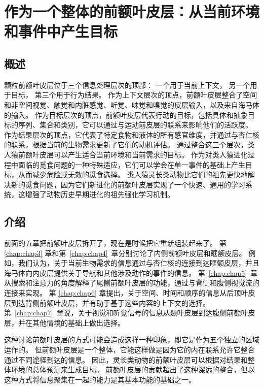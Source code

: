 \chapter{作为一个整体的前额叶皮层：从当前环境和事件中产生目标} \label{chap:chap8}

\section{概述}

颗粒前额叶皮层位于三个信息处理层次的顶部：
一个用于当前上下文，
另一个用于目标，
第三个用于行为结果。
作为上下文层次的顶点，前额叶皮层整合了空间和非空间视觉、触觉和内脏感觉、听觉、味觉和嗅觉的皮层输入，以及来自海马体的输入。
作为目标层次的顶点，前额叶皮层代表行动的目标，包括具体和抽象目标的序列、集合和类别，它可以通过与运动前皮层的联系来影响他们的活跃度。
作为结果层次的顶点，它代表了特定食物和液体的所有感官维度，并通过与杏仁核的联系，根据当前的生物需求更新了它们的动机评估。
通过整合这三个层次，类人猿前额叶皮层可以产生适合当前环境和当前需求的目标。
作为对类人猿进化过程中面临的觅食问题的一种特殊适应，它们可以学会在单一事件的基础上产生目标，从而减少危险或无效的觅食选择。
类人猿灵长类动物比它们的祖先更快地解决新的觅食问题，因为它们新进化的前额叶皮层实现了一个快速、通用的学习系统，这增强了动物历史早期进化的祖先强化学习机制。



\section{介绍}
\par

前面的五章把前额叶皮层拆开了，现在是时候把它重新组装起来了。
第 \ref{chap:chap3} 章和第~\ref{chap:chap4}~章分别讨论了内侧前额叶皮层和眶额皮层。
例如，我们认为，关于当前生物需求的信息通过与杏仁核的连接到达眶额皮层，并且海马体向内皮层提供关于导航和其他涉及动作的事件的信息。
第~\ref{chap:chap5}~章从搜索和注意力的角度解释了尾侧前额叶皮层的功能，通过与背侧和腹侧视觉流的连接来实现。
第 \ref{chap:chap6} 章提出，关于空间、时间和顺序的信息从后顶叶皮层到达背侧前额叶皮层，并有助于基于这些内容的上下文的选择。
第~\ref{chap:chap7}~章说，关于视觉和听觉信号的信息从颞叶皮层到达腹侧前额叶皮层，并在其他情境的基础上做出选择。
\par


这种讨论前额叶皮层的方式可能会造成这样一种印象，即它是作为五个独立的区域运作的。
但前额叶皮层是一个整体，它能这样做是因为它的内在联系允许它整合通过不同途径到达的信息。
因此，灵长类动物的前额叶皮层可以根据对结果和整体环境的总体预测来生成目标。
前额叶皮层的贡献超出了这种深远的整合，但以这种方式将信息聚集在一起的能力是其基本功能的基础之一。
\par


